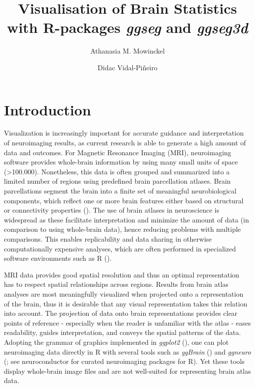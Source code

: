 \documentclass[fleqn,10pt]{wlpeerj} %
\title{Visualisation of Brain Statistics with R-packages \emph{ggseg} and \emph{ggseg3d}}
\author[1]{Athanasia M. Mowinckel}
\author[1]{Didac Vidal-Piñeiro}
\affil[1]{Center for Lifespan Changes in Brain and Cognition, University of Oslo, PO. box 1094 Blindern, 0317 Oslo, Norway}
\begin{document}
\flushbottom
\maketitle
\thispagestyle{empty}

\hypertarget{introduction}{%
\section{Introduction}\label{introduction}}

Visualization is increasingly important for accurate guidance and interpretation of neuroimaging results, as current research is able to generate a high amount of data and outcomes.
For Magnetic Resonance Imaging (MRI), neuroimaging software provides whole-brain information by using many small units of space (\textgreater{}100.000).
Nonetheless, this data is often grouped and summarized into a limited number of regions using predefined brain parcellation atlases.
Brain parcellations segment the brain into a finite set of meaningful neurobiological components, which reflect one or more brain features either based on structural or connectivity properties (\citet{eickhoff_2018}).
The use of brain atlases in neuroscience is widespread as these facilitate interpretation and minimize the amount of data (in comparison to using whole-brain data), hence reducing problems with multiple comparisons.
This enables replicability and data sharing in otherwise computationally expensive analyses, which are often performed in specialized software environments such as R (\citet{R}).

MRI data provides good spatial resolution and thus an optimal representation has to respect spatial relationships across regions.
Results from brain atlas analyses are most meaningfully visualized when projected onto a representation of the brain, thus it is desirable that any visual representation takes this relation into account.
The projection of data onto brain representations provides clear points of reference - especially when the reader is unfamiliar with the atlas - eases readability, guides interpretation, and conveys the spatial patterns of the data.
Adopting the grammar of graphics implemented in \emph{ggplot2} (\citet{ggplot}), one can plot neuroimaging data directly in R with several tools such as \emph{ggBrain} (\citet{ggBrain}) and \emph{ggneuro} (\citet{ggneuro}; see neuroconductor \citeyearpar{neuroconductor} for curated neuroimaging packages for R).
Yet these tools display whole-brain image files and are not well-suited for representing brain atlas data.
\end{document}

